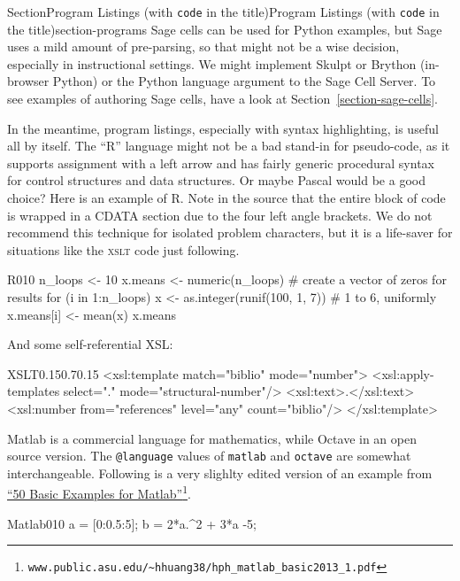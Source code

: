 \documentclass[twoside,10pt,]{article}
\newcommand{\xreffont}{\relax}
\newcommand{\mono}[1]{\texttt{#1}}
\newcommand{\initialism}[1]{\textsc{\MakeLowercase{#1}}}
\numberwithin{equation}{section}
\begin{document}
\begin{sectionptx}{Section}{Program Listings (with \mono{code} in the title)}{}{Program Listings (with \mono{code} in the title)}{}{}{section-programs}
Sage cells can be used for Python examples, but Sage uses a mild amount of pre-parsing, so that might not be a wise decision, especially in instructional settings.  We might implement Skulpt or Brython (in-browser Python) or the Python language argument to the Sage Cell Server.  To see examples of authoring Sage cells, have a look at Section~\hyperref[section-sage-cells]{{\xreffont\ref{section-sage-cells}}}.%
\par
In the meantime, program listings, especially with syntax highlighting, is useful all by itself.  The ``R'' language might not be a bad stand-in for pseudo-code, as it supports assignment with a left arrow and has fairly generic procedural syntax for control structures and data structures.  Or maybe Pascal would be a good choice?  Here is an example of R.  Note in the source that the entire block of code is wrapped in a CDATA section due to the four left angle brackets.  We do not recommend this technique for isolated problem characters, but it is a life-saver for situations like the \initialism{XSLT} code just following.%
\begin{program}{R}{0}{1}{0}
n_loops <- 10
x.means <- numeric(n_loops)  # create a vector of zeros for results
for (i in 1:n_loops){
    x <- as.integer(runif(100, 1, 7))  # 1 to 6, uniformly
    x.means[i] <- mean(x)
}
x.means
\end{program}
And some self-referential XSL:%
\begin{program}{XSLT}{0.15}{0.7}{0.15}
<xsl:template match="biblio" mode="number">
    <xsl:apply-templates select="." mode="structural-number"/>
    <xsl:text>.</xsl:text>
    <xsl:number from="references" level="any" count="biblio"/>
</xsl:template>
\end{program}
Matlab is a commercial language for mathematics, while Octave in an open source version.  The \mono{@language} values of \mono{matlab} and \mono{octave} are somewhat interchangeable.  Following is a very slighlty edited version of an example from \href{http://www.public.asu.edu/\~hhuang38/hph_matlab_basic2013_1.pdf}{``50 Basic Examples for Matlab''}\footnote{\nolinkurl{www.public.asu.edu/\~hhuang38/hph_matlab_basic2013_1.pdf}\label{section-programs-7-5}}.%
\begin{program}{Matlab}{0}{1}{0}
a = [0:0.5:5]; %
b = 2*a.^2 + 3*a -5;

\end{program}
\end{sectionptx}
\end{document}
